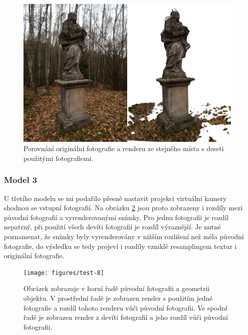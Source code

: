 \documentclass[11pt,twoside,a4paper]{book}
\begin{document}
\begin{figure}[h]
\begin{center}
\includegraphics[width=\textwidth]{figures/test-6}
\caption{Porovnání originální fotografie a renderu ze stejného místa s deseti použitými fotografiemi.}
\label{fig:test-6}
\end{center}
\end{figure}

\subsubsection*{Model 3}

U třetího modelu se mi podařilo přesně nastavit projekci virtuální kamery shodnou se vstupní fotografií. Na obrázku \ref{fig:test-8} jsou proto zobrazeny i rozdíly mezi původní fotografií a vyrenderovanými snímky. Pro jednu fotografii je rozdíl nepatrný, při použití všech devíti fotografií je rozdíl výraznější. Je nutné poznamenat, že snímky byly vyrenderovány v nižším rozlišení než měla původní fotografie, do výsledku se tedy projeví i rozdíly vzniklé resamplingem textur i originální fotografie.

\begin{figure}[h]
\begin{center}
\texttt{[image: figures/test-8]}
\caption{Obrázek zobrazuje v horní řadě původní fotografii a geometrii objektu. V prostřední řadě je zobrazen render s použitím jedné fotografie a rozdíl tohoto renderu vůči původní fotografii. Ve spodní řadě je zobrazen render z devíti fotografií a jeho rozdíl vůči původní fotografii.}
\label{fig:test-8}
\end{center}
\end{figure}
\end{document}
